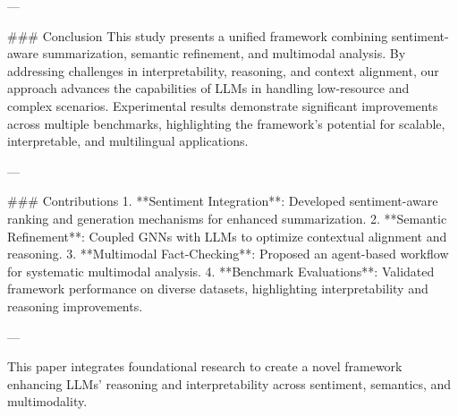 ---

### Conclusion
This study presents a unified framework combining sentiment-aware summarization, semantic refinement, and multimodal analysis. By addressing challenges in interpretability, reasoning, and context alignment, our approach advances the capabilities of LLMs in handling low-resource and complex scenarios. Experimental results demonstrate significant improvements across multiple benchmarks, highlighting the framework's potential for scalable, interpretable, and multilingual applications.

---

### Contributions
1. **Sentiment Integration**: Developed sentiment-aware ranking and generation mechanisms for enhanced summarization.
2. **Semantic Refinement**: Coupled GNNs with LLMs to optimize contextual alignment and reasoning.
3. **Multimodal Fact-Checking**: Proposed an agent-based workflow for systematic multimodal analysis.
4. **Benchmark Evaluations**: Validated framework performance on diverse datasets, highlighting interpretability and reasoning improvements.

---

This paper integrates foundational research to create a novel framework enhancing LLMs' reasoning and interpretability across sentiment, semantics, and multimodality.